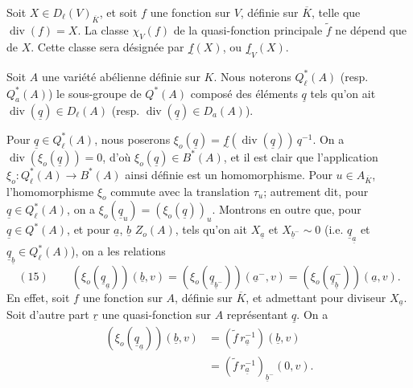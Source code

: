 Soit $X\in D_\ell(V)_{\overline K}$, et soit $f$ une fonction sur $V$, définie sur $\overline K$, telle que $\operatorname{div}(f)=X$. La classe $\chi_V(f)$ de la quasi-fonction principale $\widetilde f$ ne dépend que de $X$. Cette classe sera désignée par $\underset{\sim}{f}(X)$, ou $\underset{\sim}{f}_V(X)$.

Soit $A$ une variété abélienne définie sur $K$. Nous noterons $Q^*_\ell(A)$ (resp. $Q^*_a(A)$) le sous-groupe de $Q^*(A)$ composé des éléments $\underline q$ tels qu'on ait $\operatorname{div}(\underline q)\in D_\ell(A)$ (resp. $\operatorname{div}(\underline q)\in D_a(A)$).

Pour $\underline q\in Q^*_\ell(A)$, nous poserons $\xi_o(\underline q)=\underset{\sim}{f}(\operatorname{div}(\underline q))\,q^{-1}$. On a $\operatorname{div}(\xi_o(\underline q))=0$, d'où $\xi_o(\underline q)\in B^*(A)$, et il est clair que l'application $\xi_o:Q^*_\ell(A)\longrightarrow B^*(A)$ ainsi définie est un homomorphisme. Pour $u\in A_{\overline K}$, l'homomorphisme $\xi_o$ commute avec la translation $\tau_u$; autrement dit, pour $\underline q\in Q^*_\ell(A)$, on a $\xi_o(\underline q_u)=(\xi_o(\underline q))_u$. Montrons en outre que, pour $\underline q\in Q^*(A)$, et pour $\underline a$, $\underline b$ $Z_o(A)$, tels qu'on ait $X_{\underline a}$ et $X_{\underline b^-}\sim0$ (i.e. $\underline q_{\underline a}$ et $\underline q_{\underline b}\in Q^*_\ell(A)$), on a les relations
\[
(15)\qquad (\xi_o(\underline q_{\underline a}))(\underline b,v)=(\xi_o(\underline q_{\underline b^-}))(\underline a^-,v)=(\xi_o(\underline q^-_{\underline b}))(\underline a,v).
\]
En effet, soit $f$ une fonction sur $A$, définie sur $\overline K$, et admettant pour diviseur $X_{\underline a}$. Soit d'autre part $\underline r$ une quasi-fonction sur $A$ représentant $\underline q$. On a
\[
\begin{aligned}
(\xi_o(\underline q_{\underline a}))(\underline b,v)&=(\widetilde f\,r_{\underline a}^{-1})(\underline b,v)\\
&=(\widetilde f\,r_{\underline a}^{-1})_{\underline b^-}(0,v).
\end{aligned}
\]


